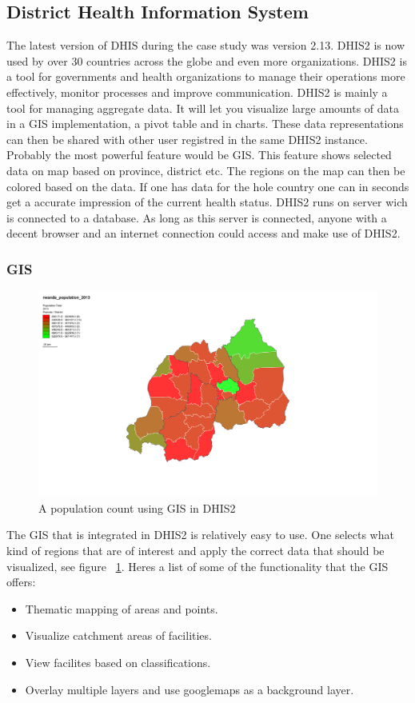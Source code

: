 \begin{description}
\subsection{District Health Information System}
\label{sec:dhis}
The latest version of DHIS during the case study was version 2.13.
DHIS2 is now used by over 30 countries across the globe and even more organizations.
DHIS2 is a tool for governments and health organizations to manage their operations more effectively, monitor processes and improve communication.
DHIS2 is mainly a tool for managing aggregate data. 
It will let you visualize large amounts of data in a GIS implementation, a pivot table and in charts. 
These data representations can then be shared with other user registred in the same DHIS2 instance.
Probably the most powerful feature would be GIS. 
This feature shows selected data on map based on province, district etc. 
The regions on the map can then be colored based on the data. 
If one has data for the hole country one can in seconds get a accurate impression of the current health status. 
DHIS2 runs on server wich is connected to a database. 
As long as this server is connected, anyone with a decent browser and an internet connection could access and make use of DHIS2.
\subsubsection{GIS}
\begin{figure}
\centering
\includegraphics[width=12cm]{empirical/images/map_rwanda_population_2013}
\caption{A population count using GIS in DHIS2}
\label{fig:a_population_count_using_gis_in_dhis2}
\end{figure}
The GIS that is integrated in DHIS2 is relatively easy to use. 
One selects what kind of regions that are of interest and apply the correct data that should be visualized, see figure ~\ref{fig:a_population_count_using_gis_in_dhis2}.
Heres a list of some of the functionality that the GIS offers:
\begin{itemize}
\item Thematic mapping of areas and points.
\item Visualize catchment areas of facilities.
\item View facilites based on classifications.
\item Overlay multiple layers and use googlemaps as a background layer.
\end{itemize}\cite{10}

\end{description}
